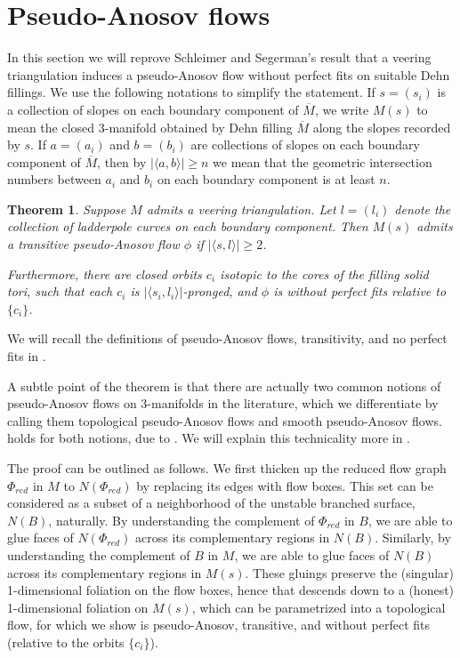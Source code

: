 \documentclass[12pt]{amsart}
\newtheorem{thm}{Theorem}[section]
\theoremstyle{definition}
\numberwithin{equation}{section}
\begin{document}
\section{Pseudo-Anosov flows} \label{sec:pAflow}

In this section we will reprove Schleimer and Segerman's result that a veering triangulation induces a pseudo-Anosov flow without perfect fits on suitable Dehn fillings. We use the following notations to simplify the statement. If $s=(s_i)$ is a collection of slopes on each boundary component of $\overline{M}$, we write $M(s)$ to mean the closed 3-manifold obtained by Dehn filling $\overline{M}$ along the slopes recorded by $s$. If $a=(a_i)$ and $b=(b_i)$ are collections of slopes on each boundary component of $\overline{M}$, then by $|\langle a,b \rangle| \geq n$ we mean that the geometric intersection numbers between $a_i$ and $b_i$ on each boundary component is at least $n$.

\begin{thm} \label{thm:vtpAflow}
Suppose $M$ admits a veering triangulation. Let $l=(l_i)$ denote the collection of ladderpole curves on each boundary component. Then $M(s)$ admits a transitive pseudo-Anosov flow $\phi$ if $|\langle s,l \rangle| \geq 2$. 

Furthermore, there are closed orbits $c_i$ isotopic to the cores of the filling solid tori, such that each $c_i$ is $|\langle s_i,l_i \rangle|$-pronged, and $\phi$ is without perfect fits relative to $\{c_i\}$.
\end{thm}

We will recall the definitions of pseudo-Anosov flows, transitivity, and no perfect fits in . 

A subtle point of the theorem is that there are actually two common notions of pseudo-Anosov flows on 3-manifolds in the literature, which we differentiate by calling them topological pseudo-Anosov flows and smooth pseudo-Anosov flows.  holds for both notions, due to . We will explain this technicality more in .

The proof can be outlined as follows. We first thicken up the reduced flow graph $\Phi_{red}$ in $M$ to $N(\Phi_{red})$ by replacing its edges with flow boxes. This set can be considered as a subset of a neighborhood of the unstable branched surface, $N(B)$, naturally. By understanding the complement of $\Phi_{red}$ in $B$, we are able to glue faces of $N(\Phi_{red})$ across its complementary regions in $N(B)$. Similarly, by understanding the complement of $B$ in $M$, we are able to glue faces of $N(B)$ across its complementary regions in $M(s)$. These gluings preserve the (singular) 1-dimensional foliation on the flow boxes, hence that descends down to a (honest) 1-dimensional foliation on $M(s)$, which can be parametrized into a topological flow, for which we show is pseudo-Anosov, transitive, and without perfect fits (relative to the orbits $\{c_i\}$).
\end{document}
